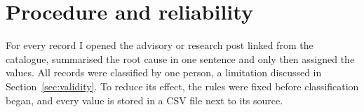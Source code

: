 \section{Procedure and reliability}

\par For every record I opened the advisory or research post linked from the catalogue, summarised the root cause in one sentence and only then assigned the values. All records were classified by one person, a limitation discussed in Section~\ref{sec:validity}. To reduce its effect, the rules were fixed before classification began, and every value is stored in a CSV file next to its source.
